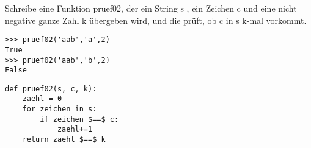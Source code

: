 \question[4] Schreibe eine Funktion pruef02, der ein String s , ein Zeichen c und eine
nicht negative ganze Zahl k übergeben wird, und die prüft, ob c in s k-mal vorkommt.
\begin{lstlisting}
>>> pruef02('aab','a',2)
True
>>> pruef02('aab','b',2)
False
\end{lstlisting}
\begin{solutionbox}{4cm}
\begin{lstlisting}
def pruef02(s, c, k):
    zaehl = 0
    for zeichen in s:
        if zeichen $==$ c:
            zaehl+=1
    return zaehl $==$ k
\end{lstlisting}
\end{solutionbox}
